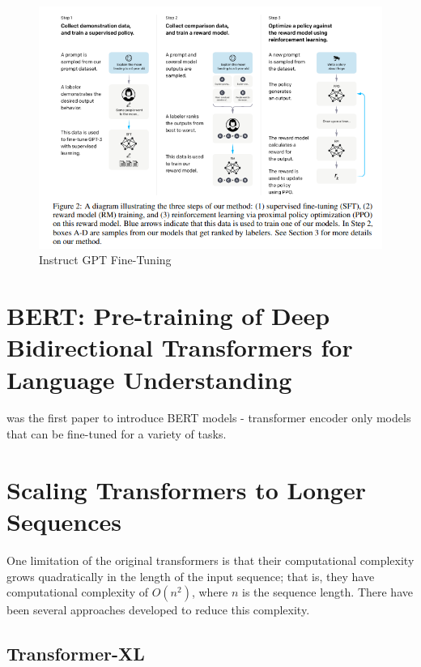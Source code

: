 \documentclass[11pt]{article}
\theoremstyle{definition}
\begin{document}
\begin{figure}
\centering
  \includegraphics[width=\textwidth,height=\textheight,keepaspectratio]{transformers/instructgpt.png}
  \caption{Instruct GPT Fine-Tuning \cite{ouyang2022training}}
  \label{fig:instructgpt}
\end{figure}

\section{BERT: Pre-training of Deep Bidirectional Transformers for Language Understanding}

\cite{devlin2019bert} was the first paper to introduce BERT models - transformer encoder only models that can be fine-tuned for a variety of tasks.

\section{Scaling Transformers to Longer Sequences}

One limitation of the original transformers is that their computational complexity grows quadratically in the length of the input sequence; that is, they have computational complexity of $O(n^2)$, where $n$ is the sequence length. There have been several approaches developed to reduce this complexity.

\subsection{Transformer-XL \cite{dai2019transformerxl}}
\end{document}
